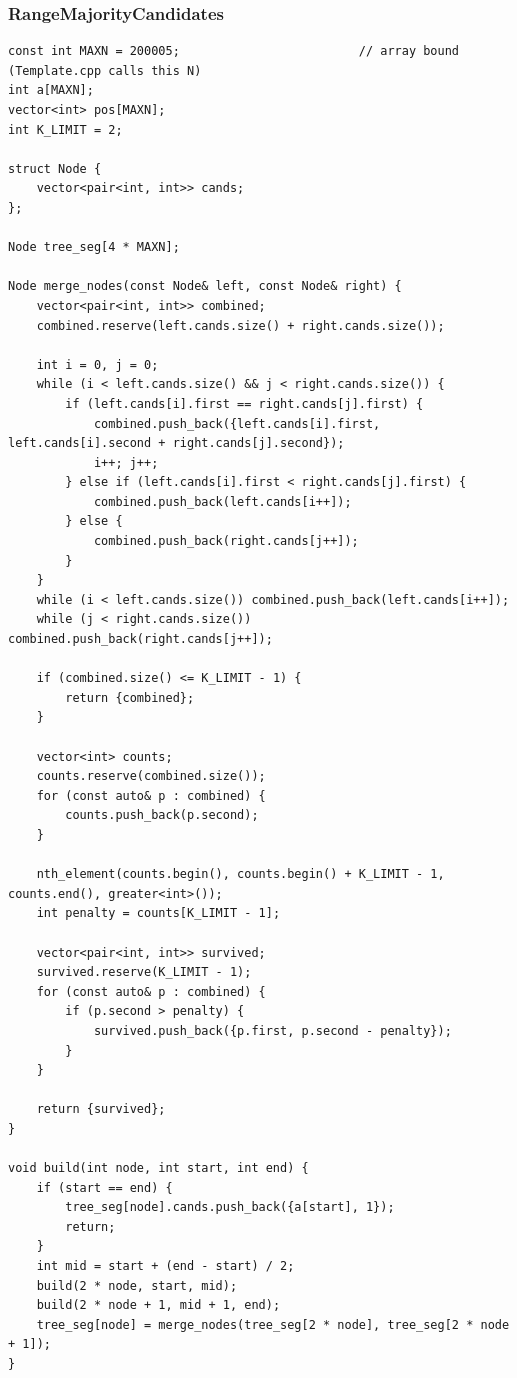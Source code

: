 \documentclass[9pt,a4paper,twocolumn]{extarticle}
\begin{document}
\filbreak
\subsubsection{RangeMajorityCandidates}
\begin{lstlisting}
const int MAXN = 200005;                         // array bound (Template.cpp calls this N)
int a[MAXN];
vector<int> pos[MAXN];
int K_LIMIT = 2;

struct Node {
    vector<pair<int, int>> cands;
};

Node tree_seg[4 * MAXN];

Node merge_nodes(const Node& left, const Node& right) {
    vector<pair<int, int>> combined;
    combined.reserve(left.cands.size() + right.cands.size());

    int i = 0, j = 0;
    while (i < left.cands.size() && j < right.cands.size()) {
        if (left.cands[i].first == right.cands[j].first) {
            combined.push_back({left.cands[i].first, left.cands[i].second + right.cands[j].second});
            i++; j++;
        } else if (left.cands[i].first < right.cands[j].first) {
            combined.push_back(left.cands[i++]);
        } else {
            combined.push_back(right.cands[j++]);
        }
    }
    while (i < left.cands.size()) combined.push_back(left.cands[i++]);
    while (j < right.cands.size()) combined.push_back(right.cands[j++]);

    if (combined.size() <= K_LIMIT - 1) {
        return {combined};
    }

    vector<int> counts;
    counts.reserve(combined.size());
    for (const auto& p : combined) {
        counts.push_back(p.second);
    }

    nth_element(counts.begin(), counts.begin() + K_LIMIT - 1, counts.end(), greater<int>());
    int penalty = counts[K_LIMIT - 1];

    vector<pair<int, int>> survived;
    survived.reserve(K_LIMIT - 1);
    for (const auto& p : combined) {
        if (p.second > penalty) {
            survived.push_back({p.first, p.second - penalty});
        }
    }

    return {survived};
}

void build(int node, int start, int end) {
    if (start == end) {
        tree_seg[node].cands.push_back({a[start], 1});
        return;
    }
    int mid = start + (end - start) / 2;
    build(2 * node, start, mid);
    build(2 * node + 1, mid + 1, end);
    tree_seg[node] = merge_nodes(tree_seg[2 * node], tree_seg[2 * node + 1]);
}


\end{lstlisting}
\end{document}
